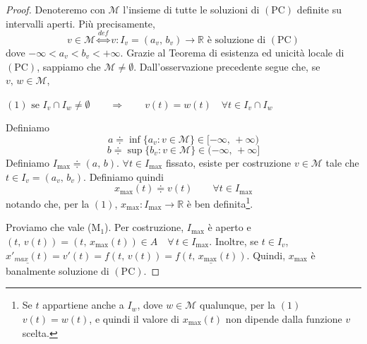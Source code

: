 \begin{proof}
Denoteremo con $\mathscr{M}$ l'insieme di tutte le soluzioni di $\mathrm{(PC)}$ definite su intervalli aperti. Più precisamente,
$$
v \in \mathscr{M} \overset{def}{\Longleftrightarrow} v : I_v = (a_v,\,b_v) \longrightarrow \mathbb{R} \text{ è soluzione di $\mathrm{(PC)}$}
$$
dove $-\infty < a_v < b_v < +\infty$. Grazie al Teorema di esistenza ed unicità locale di $\mathrm{(PC)}$, sappiamo che $\mathscr{M} \neq \emptyset$. Dall'osservazione precedente segue che, se $v,\,w \in \mathscr{M}$,
\begin{center}
$\mathrm{(1)}$
\hfill
$\displaystyle
\text{se } I_v \cap I_w \neq \emptyset \qquad\Longrightarrow\qquad v(t) = w(t) \quad \forall t \in I_v \cap I_w
$
\hfill \null \\
\end{center}
Definiamo
$$
a \doteqdot \inf \lbrace a_v : v \in \mathscr{M} \rbrace \in [-\infty,\,+\infty)
$$
$$
b \doteqdot \sup \lbrace b_v : v \in \mathscr{M} \rbrace \in (-\infty,\,+\infty]
$$
Definiamo $I_{\max} \doteqdot (a,\,b)$. $\forall t \in I_{\max}$ fissato, esiste per costruzione $v \in \mathscr{M}$ tale che $t \in I_v = (a_v,\,b_v)$. Definiamo quindi
$$
x_{\max}(t) \doteqdot v(t) \qquad \forall t \in I_{\max}
$$
notando che, per la $\mathrm{(1)}$, $x_{\max} : I_{\max} \longrightarrow \mathbb{R}$ è ben definita\footnote{
Se $t$ appartiene anche a $I_w$, dove $w \in \mathscr{M}$ qualunque, per la $\mathrm{(1)}$ $v(t) = w(t)$, e quindi il valore di $x_{\max}(t)$ non dipende dalla funzione $v$ scelta.
}.

Proviamo che vale \textnormal{(M$_1$)}. Per costruzione, $I_{\max}$ è aperto e $(t,\,v(t)) = (t,\,x_{\max}(t)) \in A \quad \forall \, t \in I_{\max}$. Inoltre, se $t \in I_v$, $\underline{x'_{max}(t)} = v'(t) = f(t,\,v(t)) = \underline{f(t,\,x_{\max}(t))}$. Quindi, $x_{\max}$ è banalmente soluzione di $\mathrm{(PC)}$.


\end{proof}
